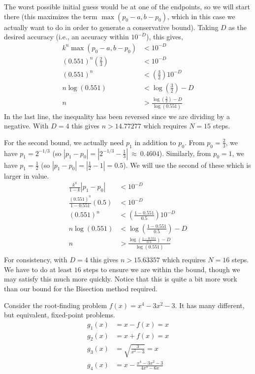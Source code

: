 \documentclass[11pt]{article}
\begin{document}
The worst possible initial guess would be at one of the endpoints, so we will start there (this maximizes the term \( \max(p_0-a, b - p_0)\), which in this case we actually want to do in order to generate a conservative bound). Taking \(D\) as the desired accuracy (i.e., an accuracy within \(10^{-D}\)), this gives, 
\begin{align*}
k^n \max(p_0-a, b - p_0) & < 10^{-D}\\
(0.551)^n \left(\frac{2}{3}\right) & < 10^{-D}\\
(0.551)^n & < \left(\frac{3}{2}\right)10^{-D}\\
n \log(0.551) & < \log\left(\frac{3}{2}\right) - D\\
n & > \frac{\log\left(\frac{3}{2}\right) - D}{\log(0.551)}
\end{align*}
In the last line, the inequality has been reversed since we are dividing by a negative. With \(D=4\) this gives \(n > 14.77277\) which requires \(N=15\) steps.

For the second bound, we actually need \(p_1\) in addition to \(p_0\). From \(p_0 = \frac{2}{3}\), we have \(p_1 = 2^{-1/3}\) (so \(|p_1-p_0| = |2^{-1/3} - \frac{1}{3}| ~\approx~ 0.4604\)). Similarly, from \(p_0=1\), we have \(p_1 = \frac{1}{2}\) (so \(|p_1-p_0| = |\frac{1}{2} - 1| = 0.5\)). We will use the second of these which is larger in value.
\begin{align*}
\frac{k^n}{1-k}|p_1-p_0| & < 10^{-D}\\
\frac{(0.551)^n}{1-0.551}(0.5) & < 10^{-D}\\
(0.551)^n & < \left(\frac{1-0.551}{0.5}\right) 10^{-D}\\
n\log(0.551) & < \log\left(\frac{1-0.551}{0.5}\right) -D\\
n & > \frac{\log\left(\frac{1-0.551}{0.5}\right) -D}{\log(0.551)}\\
\end{align*}
For consistency, with \(D=4\) this gives \(n > 15.63357\) which requires \(N=16\) steps. We have to do at least \(16\) steps to ensure we are within the bound, though we may satisfy this much more quickly. Notice that this is quite a bit more work than our bound for the Bisection method required.


Consider the root-finding problem \(f(x) = x^4-3x^2-3\). It has many different, but equivalent, fixed-point problems.
\begin{align*}
g_1(x) & = x- f(x) = x\\
g_2(x) & = x+f(x) = x\\
g_3(x) & = \sqrt{\frac{3}{x^2-3}} = x\\
g_4(x) & = x - \frac{x^4-3x^2-3}{4x^3-6x}
\end{align*}
\end{document}
